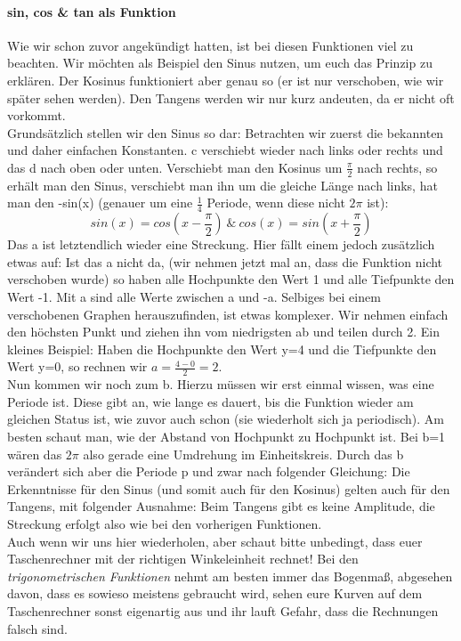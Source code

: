 		\paragraph{sin, cos \& tan als Funktion}
			Wie wir schon zuvor angekündigt hatten, ist bei diesen Funktionen viel zu
			beachten. Wir möchten als Beispiel den Sinus nutzen, um euch das Prinzip zu
			erklären. Der Kosinus funktioniert aber genau so (er ist nur verschoben, wie
			wir später sehen werden). Den Tangens werden wir nur kurz andeuten, da er
			nicht oft vorkommt.\\
			Grundsätzlich stellen wir den Sinus so dar:
			\formel{\[f(x)=a\cdot sin(b(x-c))+d\]}	
			Betrachten wir zuerst die bekannten und daher einfachen Konstanten. c
			verschiebt wieder nach links oder rechts und das d nach oben oder unten.
			Verschiebt man den Kosinus um \(\frac{\pi}{2}\) nach rechts, so erhält man
			den Sinus, verschiebt man ihn um die gleiche Länge nach links, hat man den
			-sin(x) (genauer um eine \(\frac{1}{4}\) Periode, wenn diese nicht \(2 \pi\)
			ist):
			\[sin(x)=cos(x-\frac{\pi}{2})\ \&\ cos(x)=sin(x+\frac{\pi}{2})\]
			 Das a ist letztendlich wieder eine Streckung. Hier fällt einem jedoch
			 zusätzlich etwas auf: Ist das a nicht da, (wir nehmen jetzt mal an, dass die
			 Funktion nicht verschoben wurde) so haben alle Hochpunkte den Wert 1 und
			 alle Tiefpunkte den Wert -1. Mit a sind alle Werte zwischen a und -a.
			 Selbiges bei einem verschobenen Graphen herauszufinden, ist etwas komplexer.
			 Wir nehmen einfach den höchsten Punkt und ziehen ihn vom niedrigsten ab und
			 teilen durch 2. Ein kleines Beispiel: Haben die Hochpunkte den Wert y=4 und
			 die Tiefpunkte den Wert y=0, so rechnen wir \(a=\frac{4-0}{2}=2\).\\
 			Nun kommen wir noch zum b. Hierzu müssen wir erst einmal wissen, was eine
 			Periode ist. Diese gibt an, wie lange es dauert, bis die Funktion wieder am
			 gleichen Status ist, wie zuvor auch schon (sie wiederholt sich ja
			 periodisch).
			 Am besten schaut man, wie der Abstand von Hochpunkt zu Hochpunkt ist. Bei
			 b=1 wären das \(2\pi\) also gerade eine Umdrehung im Einheitskreis. Durch
			 das b verändert sich aber die Periode p und zwar nach folgender Gleichung:
 			\formel{\[p=\frac{2\pi}{b}\]}
			 Die Erkenntnisse für den Sinus (und somit auch für den Kosinus) gelten auch
 			für den Tangens, mit folgender Ausnahme: Beim Tangens gibt es keine
 			Amplitude, die Streckung erfolgt also wie bei den vorherigen Funktionen.\\
 			Auch wenn wir uns hier wiederholen, aber schaut bitte unbedingt, dass euer
 			Taschenrechner mit der richtigen Winkeleinheit rechnet! Bei den
 			\textit{trigonometrischen Funktionen} nehmt am besten immer das Bogenmaß,
 			abgesehen davon, dass es sowieso meistens gebraucht wird, sehen eure Kurven
 			auf dem Taschenrechner sonst eigenartig aus und ihr lauft Gefahr, dass die
 			Rechnungen falsch sind.

